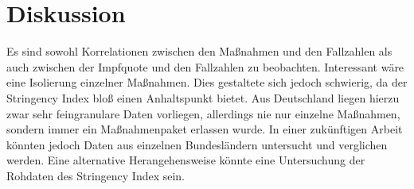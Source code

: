 \newpage

\section{Diskussion}

Es sind sowohl Korrelationen zwischen den Maßnahmen und den Fallzahlen als auch zwischen der Impfquote und den Fallzahlen zu beobachten. Interessant wäre eine Isolierung einzelner Maßnahmen. Dies gestaltete sich jedoch schwierig, da der Stringency Index bloß einen Anhaltspunkt bietet. Aus Deutschland liegen hierzu zwar sehr feingranulare Daten vorliegen, allerdings nie nur einzelne Maßnahmen, sondern immer ein Maßnahmenpaket erlassen wurde. In einer zukünftigen Arbeit könnten jedoch Daten aus einzelnen Bundesländern untersucht und verglichen werden. Eine alternative Herangehensweise könnte eine Untersuchung der Rohdaten des Stringency Index sein.

